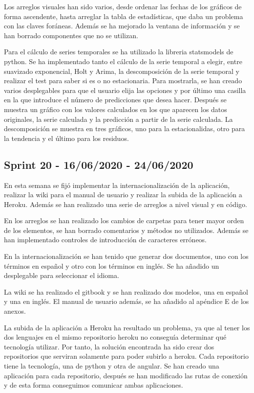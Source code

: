 Los arreglos visuales han sido varios, desde ordenar las fechas de los gráficos de forma ascendente, hasta arreglar la tabla de estadísticas, que daba un problema con las claves foráneas.
Además se ha mejorado la ventana de información y se han borrado componentes que no se utilizan.

Para el cálculo de series temporales se ha utilizado la libreria statsmodels de python.
Se ha implementado tanto el cálculo de la serie temporal a elegir, entre suavizado exponencial, Holt y Arima, la descomposición de la serie temporal y realizar el test para saber si es o no estacionaria.
Para mostrarla, se han creado varios desplegables para que el usuario elija las opciones y por último una casilla en la que introduce el número de predicciones que desea hacer.
Después se muestra un gráfico con los valores calculados en los que aparecen los datos originales, la serie calculada y la predicción a partir de la serie calculada. La descomposición se muestra en tres gráficos, uno para la estacionalidas, otro para la tendencia y el último para los residuos.


\subsection{Sprint 20 - 16/06/2020 - 24/06/2020}
En esta semana se fijó implementar la internacionalización de la aplicación, realizar la wiki para el manual de usuario y realizar la subida de la aplicación a Heroku. Además se han realizado una serie de arreglos a nivel visual y en código.

En los arreglos se han realizado los cambios de carpetas para tener mayor orden de los elementos, se han borrado comentarios y métodos no utilizados. Además se han implementado controles de introducción de caracteres erróneos.

En la internacionalización se han tenido que generar dos documentos, uno con los términos en español y otro con los términos en inglés. Se ha añadido un desplegable para seleccionar el idioma.

La wiki se ha realizado el gitbook y se han realizado dos modelos, una en español y una en inglés. El manual de usuario además, se ha añadido al apéndice E de los anexos.

La subida de la aplicación a Heroku ha resultado un problema, ya que al tener los dos lenguajes en el mismo repositorio heroku no conseguía determinar qué tecnología utilizar.
Por tanto, la solución encontrada ha sido crear dos repositorios que serviran solamente para poder subirlo a heroku. Cada repositorio tiene la tecnología, una de python y otra de angular. Se han creado una aplicación para cada repositorio, después se han modificado las rutas de conexión y de esta forma conseguimos comunicar ambas aplicaciones.

